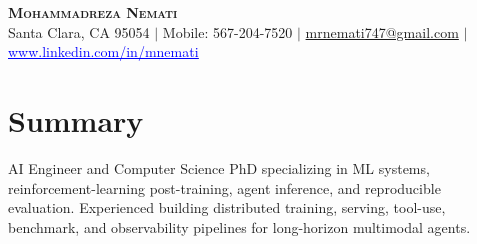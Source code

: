 \documentclass[letterpaper,13pt]{article}
\begin{document}
\begin{center}
    \textbf{\LARGE \scshape Mohammadreza Nemati} \\ \vspace{1pt}
    \small Santa Clara, CA 95054 $|$ Mobile: 567-204-7520 $|$
    \href{mailto:mrnemati747@gmail.com}{mrnemati747@gmail.com} $|$
    \href{https://www.linkedin.com/in/mnemati/}{\textcolor{blue}{\underline{www.linkedin.com/in/mnemati}}}
\end{center}

\section{Summary}
\small{AI Engineer and Computer Science PhD specializing in ML systems, reinforcement-learning post-training, agent inference, and reproducible evaluation. Experienced building distributed training, serving, tool-use, benchmark, and observability pipelines for long-horizon multimodal agents.}
\vspace{0.05cm}
\end{document}

